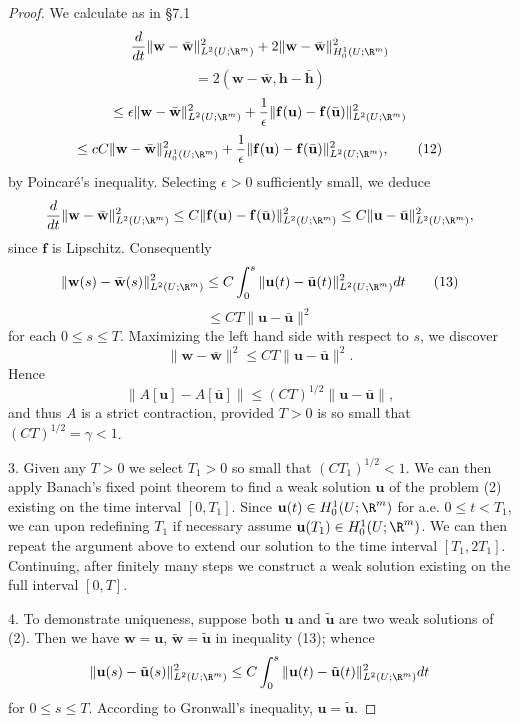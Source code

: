 \begin{proof}
We calculate as in \S7.1
\[
\frac{d}{dt}\|\mathbf{w} - \bar{\mathbf{w}}\|^2_{L^2(U;\R^m)} + 2\|\mathbf{w} - \bar{\mathbf{w}}\|^2_{H_0^1(U;\R^m)}
\]
\[
= 2(\mathbf{w} - \bar{\mathbf{w}}, \mathbf{h} - \bar{\mathbf{h}})
\]
\[
\le \epsilon\|\mathbf{w} - \bar{\mathbf{w}}\|^2_{L^2(U;\R^m)} + \frac{1}{\epsilon}\|\mathbf{f}(\mathbf{u}) - \mathbf{f}(\bar{\mathbf{u}})\|^2_{L^2(U;\R^m)}
\]
\[
\le cC\|\mathbf{w} - \bar{\mathbf{w}}\|^2_{H_0^1(U;\R^m)} + \frac{1}{\epsilon}\|\mathbf{f}(\mathbf{u}) - \mathbf{f}(\bar{\mathbf{u}})\|^2_{L^2(U;\R^m)},
\tag{12}
\]
by Poincaré's inequality. Selecting $\epsilon > 0$ sufficiently small, we deduce
\[
\frac{d}{dt}\|\mathbf{w} - \bar{\mathbf{w}}\|^2_{L^2(U;\R^m)} \le C\|\mathbf{f}(\mathbf{u}) - \mathbf{f}(\bar{\mathbf{u}})\|^2_{L^2(U;\R^m)} \le C\|\mathbf{u} - \bar{\mathbf{u}}\|^2_{L^2(U;\R^m)},
\]
since $\mathbf{f}$ is Lipschitz. Consequently
\[
\|\mathbf{w}(s) - \bar{\mathbf{w}}(s)\|^2_{L^2(U;\R^m)} \le C \int_0^s \|\mathbf{u}(t) - \bar{\mathbf{u}}(t)\|^2_{L^2(U;\R^m)} dt
\tag{13}
\]
\[
\le CT\|\mathbf{u} - \bar{\mathbf{u}}\|^2
\]
for each $0 \le s \le T$. Maximizing the left hand side with respect to $s$, we discover
\[
\|\mathbf{w} - \bar{\mathbf{w}}\|^2 \le CT\|\mathbf{u} - \bar{\mathbf{u}}\|^2.
\]
Hence
\[
\|A[\mathbf{u}] - A[\bar{\mathbf{u}}]\| \le (CT)^{1/2}\|\mathbf{u} - \bar{\mathbf{u}}\|,
\tag{14}
\]
and thus $A$ is a strict contraction, provided $T > 0$ is so small that $(CT)^{1/2} = \gamma < 1$.

3. Given any $T > 0$ we select $T_1 > 0$ so small that $(CT_1)^{1/2} < 1$. We can then apply Banach's fixed point theorem to find a weak solution $\mathbf{u}$ of the problem (2) existing on the time interval $[0, T_1]$. Since $\mathbf{u}(t) \in H_0^1(U; \R^m)$ for a.e. $0 \le t < T_1$, we can upon redefining $T_1$ if necessary assume $\mathbf{u}(T_1) \in H_0^1(U; \R^m)$. We can then repeat the argument above to extend our solution to the time interval $[T_1, 2T_1]$. Continuing, after finitely many steps we construct a weak solution existing on the full interval $[0, T]$.

4. To demonstrate uniqueness, suppose both $\mathbf{u}$ and $\tilde{\mathbf{u}}$ are two weak solutions of (2). Then we have $\mathbf{w} = \mathbf{u}$, $\tilde{\mathbf{w}} = \tilde{\mathbf{u}}$ in inequality (13); whence
\[
\|\mathbf{u}(s) - \tilde{\mathbf{u}}(s)\|_{L^2(U;\R^m)}^2 \le C \int_0^s \|\mathbf{u}(t) - \tilde{\mathbf{u}}(t)\|_{L^2(U;\R^m)}^2 dt
\]
for $0 \le s \le T$. According to Gronwall's inequality, $\mathbf{u} = \tilde{\mathbf{u}}$.
\end{proof}

